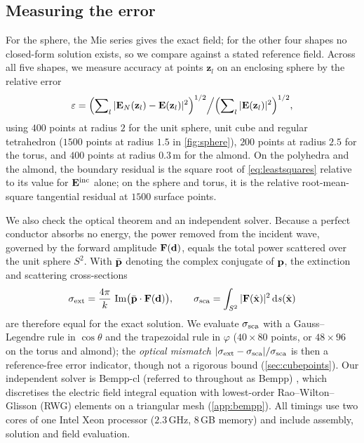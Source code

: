 \subsection{Measuring the error}
\label{sec:errors}

For the sphere, the Mie series \cite{mie1908,bohren1998} gives the exact field; for the other four shapes no closed-form solution exists, so we compare against a stated reference field. Across all five shapes, we measure accuracy at points $\mathbf{z}_l$ on an enclosing sphere by the relative error
\begin{equation}
  \varepsilon = \Bigl(\sum\nolimits_{l}|\mathbf{E}_N(\mathbf{z}_l)-\mathbf{E}(\mathbf{z}_l)|^2\Bigr)^{1/2}\Big/\Bigl(\sum\nolimits_{l}|\mathbf{E}(\mathbf{z}_l)|^2\Bigr)^{1/2},
  \label{eq:fielderror}
\end{equation}
using $400$ points at radius $2$ for the unit sphere, unit cube and regular tetrahedron ($1500$ points at radius $1.5$ in \autoref{fig:sphere}), $200$ points at radius $2.5$ for the torus, and $400$ points at radius $0.3$\,m for the almond. On the polyhedra and the almond, the boundary residual is the square root of \eqref{eq:leastsquares} relative to its value for $\mathbf{E}^{\mathrm{inc}}$ alone; on the sphere and torus, it is the relative root-mean-square tangential residual at $1500$ surface points.

We also check the optical theorem and an independent solver. Because a perfect conductor absorbs no energy, the power removed from the incident wave, governed by the forward amplitude $\mathbf{F}(\mathbf{d})$, equals the total power scattered over the unit sphere $S^2$. With $\bar{\mathbf{p}}$ denoting the complex conjugate of $\mathbf{p}$, the extinction and scattering cross-sections
\begin{equation}
  \sigma_{\mathrm{ext}} = \frac{4\pi}{k}\,\operatorname{Im}\bigl(\bar{\mathbf{p}}\cdot\mathbf{F}(\mathbf{d})\bigr), \qquad
  \sigma_{\mathrm{sca}} = \int_{S^2}|\mathbf{F}(\hat{\mathbf{x}})|^2\,\mathrm{d}s(\hat{\mathbf{x}})
  \label{eq:optical}
\end{equation}
are therefore equal for the exact solution. We evaluate $\sigma_{\mathrm{sca}}$ with a Gauss--Legendre rule in $\cos\theta$ and the trapezoidal rule in $\varphi$ ($40\times80$ points, or $48\times96$ on the torus and almond); the \emph{optical mismatch} $|\sigma_{\mathrm{ext}}-\sigma_{\mathrm{sca}}|/\sigma_{\mathrm{sca}}$ is then a reference-free error indicator, though not a rigorous bound (\autoref{sec:cubepoints}). Our independent solver is Bempp-cl (referred to throughout as Bempp) \cite{betcke2021,scroggs2017}, which discretises the electric field integral equation with lowest-order Rao--Wilton--Glisson (RWG) elements \cite{rao1982} on a triangular mesh (\ref{app:bempp}). All timings use two cores of one Intel Xeon processor ($2.3$\,GHz, $8$\,GB memory) and include assembly, solution and field evaluation.
